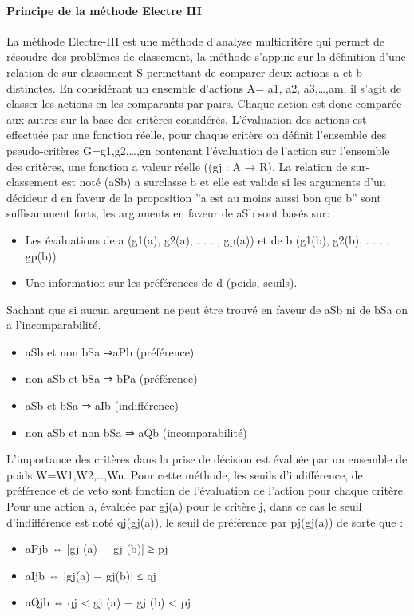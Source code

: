 \paragraph{Principe de la méthode Electre III}
La méthode Electre-III est une méthode d’analyse multicritère qui permet de résoudre des problèmes de classement, la méthode s’appuie sur la définition d’une relation de sur-classement S permettant de comparer deux actions a et b distinctes. En considérant un ensemble d’actions A= {a1, a2, a3,…,am}, il s’agit de classer les actions en les comparants par pairs. Chaque action est donc comparée aux autres sur la base des critères considérés. L’évaluation des actions est effectuée par une fonction réelle, pour chaque critère on définit l’ensemble des pseudo-critères G={g1,g2,…,gn} contenant l’évaluation de l’action sur l’ensemble des critères, une fonction a valeur réelle ((gj  : A → R).
La relation de sur-classement est noté (aSb) a surclasse b et elle est valide si les arguments d’un décideur d en faveur de la proposition ”a est au moins aussi bon que b” sont suffisamment forts, les arguments en faveur de aSb sont basés sur:
\begin{itemize}
\item Les évaluations de a (g1(a), g2(a), . . . , gp(a)) et de b (g1(b), g2(b), . . . , gp(b))
\item Une information sur les préférences de d (poids, seuils).
\end{itemize}
Sachant que si aucun argument ne peut être trouvé en faveur de aSb ni de bSa	on a l’incomparabilité.
\begin{itemize}
\item aSb et non bSa ⇒aPb (préférence)	
\item non aSb et bSa ⇒ bPa (préférence)
\item aSb et bSa ⇒ aIb (indifférence)
\item non aSb et non bSa ⇒ aQb (incomparabilité)
\end{itemize}

L’importance des critères dans la prise de décision est évaluée par un ensemble de poids W={W1,W2,…,Wn}. Pour cette méthode, les seuils d’indifférence, de préférence et de veto sont fonction de l’évaluation de l’action pour chaque critère. Pour une action a, évaluée par gj(a) pour le critère j, dans ce cas le seuil d’indifférence est noté qj(gj(a)), le seuil de préférence par pj(gj(a)) de sorte que :
\begin{itemize}
\item aPjb	⇔	|gj (a) − gj (b)| ≥ pj
\item aIjb	⇔	|gj(a) − gj(b)| ≤ qj
\item aQjb	⇔	qj  < gj (a) − gj (b) < pj
\end{itemize}

